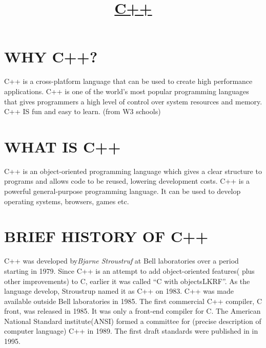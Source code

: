 \documentclass{article}
\begin{document}
	\title{\underline{\textbf{C++}}}
	\maketitle
	\section{WHY C++?} 
	C++ is a cross-platform language that can be used to create high performance applications. C++ is one of the world’s most popular programming languages that gives programmers a high level of control over system resources and memory. C++ IS fun and easy to learn. (from W3 schools)
	\section{WHAT IS C++}
	C++ is an object-oriented programming language which gives a clear structure to programs and allows code to be reused, lowering development costs. C++ is a powerful general-purpose programming language. It can be used to develop operating systems, browsers, games etc.
	\section{BRIEF HISTORY OF C++}
	C++ was developed by\emph{Bjarne Stroustruf} at Bell laboratories over a period starting in 1979. Since C++ is an attempt to add object-oriented features( plus other improvements) to C, earlier it was called “C with objectsLKRF”. As the language develop, Stroustrup named it as C++ on 1983.
	C++ was made available outside Bell laboratories in 1985. The first commercial C++ compiler, C front, was released in 1985. It was only a front-end compiler for C.
	The American National Standard institute(ANSI) formed a committee for (precise description of computer language) C++ in 1989. The first draft standards were published in in 1995.
\end{document}

